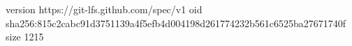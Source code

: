 version https://git-lfs.github.com/spec/v1
oid sha256:815c2cabc91d3751139a4f5efb4d004198d261774232b561c6525ba27671740f
size 1215

